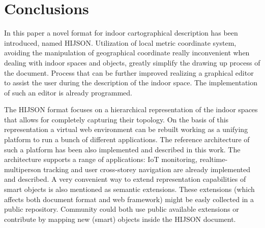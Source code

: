 \section{Conclusions}\label{conclusions}

In this paper a novel format for indoor cartographical description has been
introduced, named HIJSON. Utilization of local metric coordinate system,
avoiding the manipulation of geographical coordinate really inconvenient when
dealing with indoor spaces and objects, greatly simplify the drawing up
process of the document. Process that can be further improved realizing a
graphical editor to assist the user during the description of the indoor
space. The implementation of such an editor is already programmed.

The HIJSON format focuses on a hierarchical representation of the indoor
spaces that allows for completely capturing their topology. On the basis of
this representation a virtual web environment can be rebuilt working as a
unifying platform to run a bunch of different applications. The reference
architecture of such a platform has been also implemented and described in
this work. The architecture supports a range of applications: IoT monitoring,
realtime-multiperson tracking and user cross-storey navigation are already
implemented and described. A very convenient way to extend representation
capabilities of smart objects is also mentioned as semantic extensions. These
extensions (which affects both document format and web framework) might be
easly collected in a public repository. Community could both use public
available extensions or contribute by mapping new (smart) objects inside the
HIJSON document.

